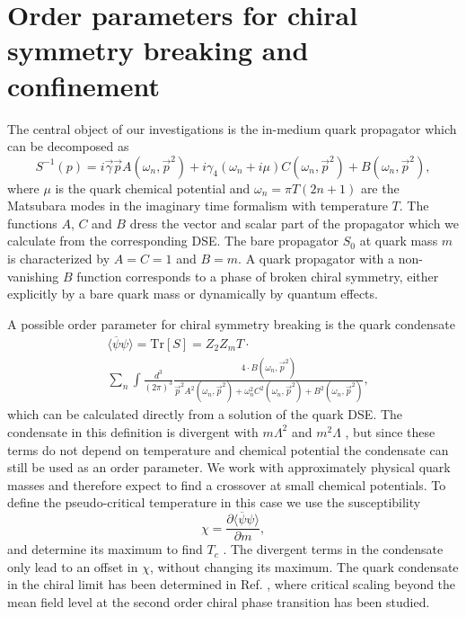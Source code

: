 \documentclass[a4paper,fleqn]{cas-dc}
\begin{document}
\section{Order parameters for chiral symmetry breaking and confinement}
The central object of our investigations is the in-medium quark propagator which can be decomposed as
\begin{equation}
	S^{-1}(p) = i \vec{\gamma} \vec{p} A(\omega_n, \vec{p}^2) + i \gamma_4(\omega_n + i\mu)C(\omega_n, \vec{p}^2) + B(\omega_n,\vec{p}^2) ,
\end{equation}
where $\mu$ is the quark chemical potential and $\omega_n = \pi T( 2n + 1 )$ are the Matsubara modes in the imaginary time formalism
with temperature $T$. The functions $A$, $C$ and $B$ dress the vector and scalar part of the propagator which we calculate from the
corresponding DSE. The bare propagator $S_0$ at quark mass $m$ is characterized by $A = C = 1$ and $B = m$. A quark propagator
with a non-vanishing $B$ function corresponds to a phase of broken chiral symmetry, either explicitly by a bare quark mass
or dynamically by quantum effects.

A possible order parameter for chiral symmetry breaking is the quark condensate
\begin{equation}
\begin{split}
	&\langle \overline{\psi} \psi \rangle = \text{Tr}[S] = Z_2 Z_m T \cdot \\
	&\sum_n \int \frac{d^3}{(2 \pi)^3} \frac{4 \cdot B(\omega_n, \vec{p}^2)}{\vec{p}^2 A^2(\omega_n, \vec{p}^2) + \omega_n^2 C^2(\omega_n, \vec{p}^2) + B^2(\omega_n, \vec{p}^2)},
	\end{split}
\end{equation}
which can be calculated directly from a solution of the quark DSE. The condensate in this definition is divergent with $m \Lambda^2$
and $m^2 \Lambda$ , but since these terms do not depend on temperature and chemical potential the condensate can still be used as
an order parameter. We work with approximately physical quark masses and therefore expect to find a crossover at small
chemical potentials. To define the pseudo-critical temperature in this case we use the susceptibility
\begin{equation}
	\chi = \frac{\partial \langle \overline{\psi}\psi \rangle}{\partial m},
\end{equation}
and determine its maximum to find $T_c$ . The divergent terms in the condensate only lead to an offset in $\chi$, without changing
its maximum. The quark condensate in the chiral limit has been determined in Ref. \cite{PhysRevD.84.054013}, where critical scaling beyond the
mean field level at the second order chiral phase transition has been studied.
\end{document}
